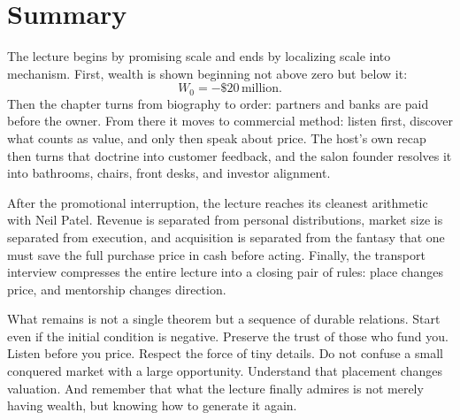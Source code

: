 \section{Summary}

The lecture begins by promising scale and ends by localizing scale into mechanism. First, wealth is shown beginning not above zero but below it:
\[
W_0 = -\$20\,\text{million}.
\]
Then the chapter turns from biography to order: partners and banks are paid before the owner. From there it moves to commercial method: listen first, discover what counts as value, and only then speak about price. The host's own recap then turns that doctrine into customer feedback, and the salon founder resolves it into bathrooms, chairs, front desks, and investor alignment.

After the promotional interruption, the lecture reaches its cleanest arithmetic with Neil Patel. Revenue is separated from personal distributions, market size is separated from execution, and acquisition is separated from the fantasy that one must save the full purchase price in cash before acting. Finally, the transport interview compresses the entire lecture into a closing pair of rules: place changes price, and mentorship changes direction.

What remains is not a single theorem but a sequence of durable relations. Start even if the initial condition is negative. Preserve the trust of those who fund you. Listen before you price. Respect the force of tiny details. Do not confuse a small conquered market with a large opportunity. Understand that placement changes valuation. And remember that what the lecture finally admires is not merely having wealth, but knowing how to generate it again.